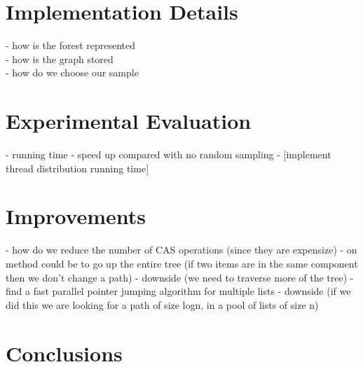 \documentclass[]{article}
\begin{document}
 
 
 \section*{Implementation Details}
 - how is the forest represented\\
 - how is the graph stored\\
 - how do we choose our sample\\
 
 \section{Experimental Evaluation}
 - running time
 - speed up compared with no random sampling
 - [implement thread distribution running time]
 
 \section{Improvements}
 - how do we reduce the number of CAS operations (since they are expensize)
  - on method could be to go up the entire tree (if two items are in the same component then we don't change a path)
  - downside (we need to traverse more of the tree)
  - find a fast parallel pointer jumping algorithm for multiple lists
  - downside (if we did this we are looking for a path of size logn, in a pool of lists of size n)
 
 \section{Conclusions}
\end{document}
